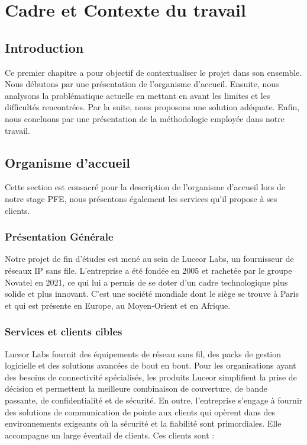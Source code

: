 \chapter{Cadre et Contexte du travail}
\section*{Introduction}
Ce premier chapitre a pour objectif de contextualiser le projet dans son ensemble. Nous débutons par une présentation de l'organisme d'accueil. Ensuite, nous analysons la problématique actuelle en mettant en avant les limites et les difficultés rencontrées. Par la suite, nous proposons une solution adéquate. Enfin, nous concluons par une présentation de la méthodologie employée dans notre travail.
\section{Organisme d'accueil}
Cette section est consacré pour la description de l’organisme d’accueil lors de notre stage PFE, nous présentons également les services qu’il propose à ses clients. 

\subsection{Présentation Générale}
Notre projet de fin d’études est mené au sein de Luceor Labs, un fournisseur de réseaux IP sans file. L'entreprise a été fondée en 2005 et rachetée par le groupe Novatel en 2021, ce qui lui a permis de se doter d'un cadre technologique plus solide et plus innovant. C'est une société mondiale dont le siège se trouve à Paris et qui est présente en Europe, au Moyen-Orient et en Afrique.

\subsection{Services et clients cibles}
 Luceor Labs fournit des équipements de réseau sans fil, des packs de gestion logicielle et des solutions avancées de bout en bout. 
Pour les organisations ayant des besoins de connectivité spécialisés, les produits Luceor simplifient la prise de décision et permettent la meilleure combinaison de couverture, de bande passante, de confidentialité et de sécurité. En outre, l'entreprise s'engage à fournir des solutions de communication de pointe aux clients qui opèrent dans des environnements exigeants où la sécurité et la fiabilité sont primordiales. Elle accompagne un large éventail de clients. Ces clients sont :

